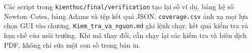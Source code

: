 Các script trong \texttt{kienthuc/final/verification} tạo lại số ví dụ, bảng hệ số Newton--Cotes, bảng Adams và tệp kết quả JSON. \texttt{coverage.csv} ánh xạ mọi lựa chọn GUI vào chương. \texttt{Kiem\_tra\_va\_nguon.md} ghi lệnh chạy, kết quả kiểm tra và hạn chế của môi trường. Khi mã thay đổi, cần chạy lại các kiểm tra và biên dịch PDF, không chỉ sửa một con số trong bản in.
